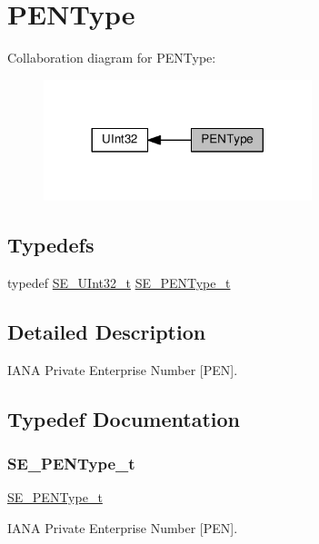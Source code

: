 \hypertarget{group__PENType}{}\section{P\+E\+N\+Type}
\label{group__PENType}
Collaboration diagram for P\+E\+N\+Type\+:\nopagebreak
\begin{figure}[H]
\begin{center}
\leavevmode
\includegraphics[width=221pt]{group__PENType}
\end{center}
\end{figure}
\subsection*{Typedefs}
\begin{DoxyCompactItemize}
\item 
typedef \hyperlink{group__UInt32_ga70bd4ecda3c0c85d20779d685a270cdb}{S\+E\+\_\+\+U\+Int32\+\_\+t} \hyperlink{group__PENType_ga75343bbeec563c431fef2977b4dfa4e9}{S\+E\+\_\+\+P\+E\+N\+Type\+\_\+t}
\end{DoxyCompactItemize}


\subsection{Detailed Description}
I\+A\+NA Private Enterprise Number \mbox{[}P\+EN\mbox{]}. 

\subsection{Typedef Documentation}
\mbox{\label{group__PENType_ga75343bbeec563c431fef2977b4dfa4e9}} 
\subsubsection{\texorpdfstring{S\+E\+\_\+\+P\+E\+N\+Type\+\_\+t}{SE\_PENType\_t}}
{\footnotesize\ttfamily \hyperlink{group__PENType_ga75343bbeec563c431fef2977b4dfa4e9}{S\+E\+\_\+\+P\+E\+N\+Type\+\_\+t}}

I\+A\+NA Private Enterprise Number \mbox{[}P\+EN\mbox{]}. 